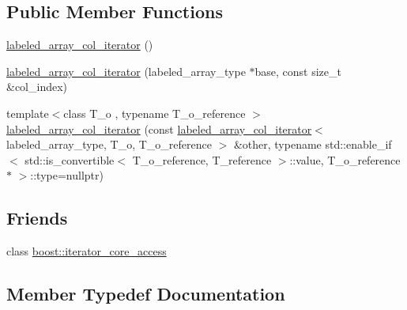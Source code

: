 \subsection*{Public Member Functions}
\begin{DoxyCompactItemize}
\item 
\hyperlink{classIceBRG_1_1labeled__array__col__iterator_a5f22796d8673d9f136a91a9d3a71d56f}{labeled\+\_\+array\+\_\+col\+\_\+iterator} ()
\item 
\hyperlink{classIceBRG_1_1labeled__array__col__iterator_a2a996e66c27707a770f8899671da29de}{labeled\+\_\+array\+\_\+col\+\_\+iterator} (labeled\+\_\+array\+\_\+type $\ast$base, const size\+\_\+t \&col\+\_\+index)
\item 
{\footnotesize template$<$class T\+\_\+o , typename T\+\_\+o\+\_\+reference $>$ }\\\hyperlink{classIceBRG_1_1labeled__array__col__iterator_a82fd920af321f7422a5564343fc489d7}{labeled\+\_\+array\+\_\+col\+\_\+iterator} (const \hyperlink{classIceBRG_1_1labeled__array__col__iterator}{labeled\+\_\+array\+\_\+col\+\_\+iterator}$<$ labeled\+\_\+array\+\_\+type, T\+\_\+o, T\+\_\+o\+\_\+reference $>$ \&other, typename std\+::enable\+\_\+if$<$ std\+::is\+\_\+convertible$<$ T\+\_\+o\+\_\+reference, T\+\_\+reference $>$\+::value, T\+\_\+o\+\_\+reference $\ast$ $>$\+::type=nullptr)
\end{DoxyCompactItemize}
\subsection*{Friends}
\begin{DoxyCompactItemize}
\item 
class \hyperlink{classIceBRG_1_1labeled__array__col__iterator_ac09f73e325921cc50ebcd96bed0f8096}{boost\+::iterator\+\_\+core\+\_\+access}
\end{DoxyCompactItemize}


\subsection{Member Typedef Documentation}
\hypertarget{classIceBRG_1_1labeled__array__col__iterator_a90300154d7c3040eff6fd81b14ca4245}{}
